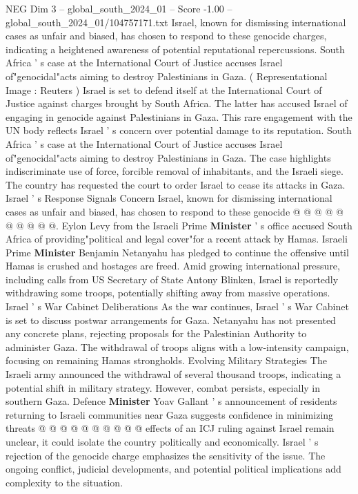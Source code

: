 \begin{textsample}{NEG Dim 3 – global\_south\_2024\_01 – Score -1.00 – global\_south\_2024\_01/104757171.txt}  \label{ex:f3_neg_073}
Israel, known for dismissing international cases as unfair and biased, has chosen to respond to these genocide charges, indicating a heightened awareness of potential reputational repercussions.
South Africa ' s case at the International Court of Justice accuses Israel of"genocidal"acts aiming to destroy Palestinians in Gaza. ( Representational Image : Reuters ) Israel is set to defend itself at the International Court of Justice against charges brought by South Africa.
The latter has accused Israel of engaging in genocide against Palestinians in Gaza.
This rare engagement with the UN body reflects Israel ' s concern over potential damage to its reputation.
South Africa ' s case at the International Court of Justice accuses Israel of"genocidal"acts aiming to destroy Palestinians in Gaza.
The case highlights indiscriminate use of force, forcible removal of inhabitants, and the Israeli siege.
The country has requested the court to order Israel to cease its attacks in Gaza.
Israel ' s Response Signals Concern Israel, known for dismissing international cases as unfair and biased, has chosen to respond to these genocide @ @ @ @ @ @ @ @ @ @.
Eylon Levy from the Israeli Prime \textbf{Minister} ' s office accused South Africa of providing"political and legal cover"for a recent attack by Hamas.
Israeli Prime \textbf{Minister} Benjamin Netanyahu has pledged to continue the offensive until Hamas is crushed and hostages are freed.
Amid growing international pressure, including calls from US Secretary of State Antony Blinken, Israel is reportedly withdrawing some troops, potentially shifting away from massive operations.
Israel ' s War Cabinet Deliberations As the war continues, Israel ' s War Cabinet is set to discuss postwar arrangements for Gaza.
Netanyahu has not presented any concrete plans, rejecting proposals for the Palestinian Authority to administer Gaza.
The withdrawal of troops aligns with a low-intensity campaign, focusing on remaining Hamas strongholds.
Evolving Military Strategies The Israeli army announced the withdrawal of several thousand troops, indicating a potential shift in military strategy.
However, combat persists, especially in southern Gaza.
Defence \textbf{Minister} Yoav Gallant ' s announcement of residents returning to Israeli communities near Gaza suggests confidence in minimizing threats @ @ @ @ @ @ @ @ @ @ effects of an ICJ ruling against Israel remain unclear, it could isolate the country politically and economically.
Israel ' s rejection of the genocide charge emphasizes the sensitivity of the issue.
The ongoing conflict, judicial developments, and potential political implications add complexity to the situation.

\end{textsample}
